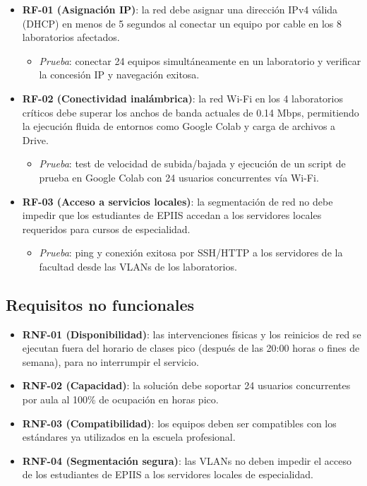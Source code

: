 	\begin{itemize}
		\item \textbf{RF-01 (Asignación IP)}: la red debe asignar una dirección IPv4 válida (DHCP) en menos de 5 segundos al conectar un equipo por cable en los 8 laboratorios afectados.
		\begin{itemize}
			\item \textit{Prueba}: conectar 24 equipos simultáneamente en un laboratorio y verificar la concesión IP y navegación exitosa.
		\end{itemize}
		\item \textbf{RF-02 (Conectividad inalámbrica)}: la red Wi-Fi en los 4 laboratorios críticos debe superar los anchos de banda actuales de 0.14 Mbps, permitiendo la ejecución fluida de entornos como Google Colab y carga de archivos a Drive.
		\begin{itemize}
			\item \textit{Prueba}: test de velocidad de subida/bajada y ejecución de un script de prueba en Google Colab con 24 usuarios concurrentes vía Wi-Fi.
		\end{itemize}
		\item \textbf{RF-03 (Acceso a servicios locales)}: la segmentación de red no debe impedir que los estudiantes de EPIIS accedan a los servidores locales requeridos para cursos de especialidad.
		\begin{itemize}
			\item \textit{Prueba}: ping y conexión exitosa por SSH/HTTP a los servidores de la facultad desde las VLANs de los laboratorios.
		\end{itemize}
	\end{itemize}

\subsection{Requisitos no funcionales}

	\begin{itemize}
		\item \textbf{RNF-01 (Disponibilidad)}: las intervenciones físicas y los reinicios de red se ejecutan fuera del horario de clases pico (después de las 20:00 horas o fines de semana), para no interrumpir el servicio.
		\item \textbf{RNF-02 (Capacidad)}: la solución debe soportar 24 usuarios concurrentes por aula al 100\% de ocupación en horas pico.
		\item \textbf{RNF-03 (Compatibilidad)}: los equipos deben ser compatibles con los estándares ya utilizados en la escuela profesional.
		\item \textbf{RNF-04 (Segmentación segura)}: las VLANs no deben impedir el acceso de los estudiantes de EPIIS a los servidores locales de especialidad.
	\end{itemize}

